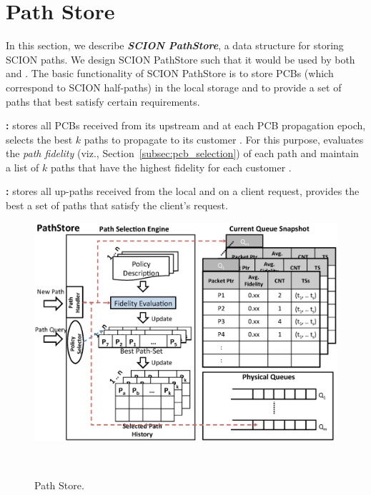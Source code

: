 \newcommand{\sps}{SCION PathStore\@\xspace}
\newcommand{\pse}{path-selection engine\@\xspace}
\newcommand{\PSE}{Path-selection Engine\@\xspace}
\newcommand{\qs}{queue snapshot\@\xspace}
\newcommand{\QS}{Queue Snapshot\@\xspace}
\newcommand{\sq}{SCION queue\@\xspace}
\newcommand{\SQ}{SCION Queue\@\xspace}
\newcommand{\BPS}{Best-path Set\@\xspace}
\newcommand{\bps}{best-path set\@\xspace}
\newcommand{\stride}{STRIDE\@\xspace}

\chapter{Path Store}
In this section, we describe {\em \bf SCION PathStore}, a data structure for storing SCION paths. We design \sps such that it would be used by both \BS and \CS.
The basic functionality of \sps is to store PCBs (which correspond to
SCION half-paths) in the local storage and to provide a set of paths
that best satisfy certain requirements.

{\bf \BS: } \BS stores all PCBs received from its upstream \ADs and at
each PCB propagation epoch, selects the best $k$ paths to propagate to
its customer \ADs. For this purpose, \BS evaluates the {\em path
  fidelity} (viz., Section~\ref{subsec:pcb_selection}) of each path
and maintain a list of $k$ paths that have the highest fidelity for
each customer \AD.

{\bf \PS: } \PS stores all up-paths received from the local \BS and on a client request, provides the best a set of paths that satisfy the client's request.

\begin{figure}[th]
\centering
\includegraphics[width=.9\columnwidth]{./fig/path_store.eps}
\caption{Path Store.}~\label{fig:path_store}
\end{figure}


